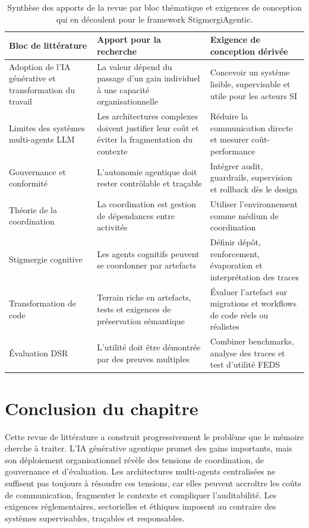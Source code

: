 \begin{table}[H]
\centering
\small
\begin{tabularx}{\linewidth}{@{}XXX@{}}
\toprule
\textbf{Bloc de littérature} & \textbf{Apport pour la recherche} & \textbf{Exigence de conception dérivée} \\
\midrule
Adoption de l'IA générative et transformation du travail & La valeur dépend du passage d'un gain individuel à une capacité organisationnelle & Concevoir un système lisible, supervisable et utile pour les acteurs SI \\
Limites des systèmes multi-agents LLM & Les architectures complexes doivent justifier leur coût et éviter la fragmentation du contexte & Réduire la communication directe et mesurer coût-performance \\
Gouvernance et conformité & L'autonomie agentique doit rester contrôlable et traçable & Intégrer audit, guardrails, supervision et rollback dès le design \\
Théorie de la coordination & La coordination est gestion de dépendances entre activités & Utiliser l'environnement comme médium de coordination \\
Stigmergie cognitive & Les agents cognitifs peuvent se coordonner par artefacts & Définir dépôt, renforcement, évaporation et interprétation des traces \\
Transformation de code & Terrain riche en artefacts, tests et exigences de préservation sémantique & Évaluer l'artefact sur migrations et workflows de code réels ou réalistes \\
Évaluation DSR & L'utilité doit être démontrée par des preuves multiples & Combiner benchmarks, analyse des traces et test d'utilité FEDS \\
\bottomrule
\end{tabularx}
\caption{Synthèse des apports de la revue par bloc thématique et exigences de conception qui en découlent pour le framework StigmergiAgentic.}
\label{tab:rev-synthese-blocs}
\end{table}

\section{Conclusion du chapitre}\label{conclusion-du-chapitre}

Cette revue de littérature a construit progressivement le problème que le mémoire cherche à traiter. L'IA générative agentique promet des gains importants, mais son déploiement organisationnel révèle des tensions de coordination, de gouvernance et d'évaluation. Les architectures multi-agents centralisées ne suffisent pas toujours à résoudre ces tensions, car elles peuvent accroître les coûts de communication, fragmenter le contexte et compliquer l'auditabilité. Les exigences réglementaires, sectorielles et éthiques imposent au contraire des systèmes supervisables, traçables et responsables.

